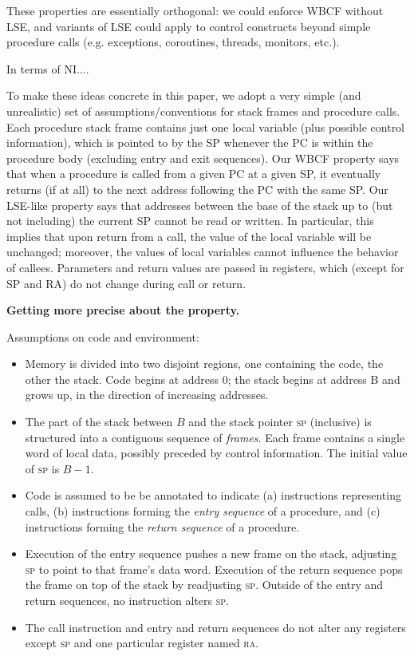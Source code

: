 \documentclass[conference]{IEEEtran}
\begin{document}
These properties are essentially orthogonal: we could enforce WBCF without LSE, and variants of
LSE could apply to control constructs beyond simple procedure calls (e.g. exceptions, coroutines, threads, monitors, etc.).


In terms of NI....

To make these ideas concrete in this paper, we adopt a very simple (and unrealistic) set of assumptions/conventions for stack frames and procedure calls.
Each procedure stack frame contains just one local variable (plus possible control information), which is pointed to by
the SP whenever the PC is within the procedure body (excluding entry and exit sequences). Our WBCF property says that
when a procedure is called from a given PC at a given SP, it eventually returns (if at all) to the next
address following the PC with the same SP. Our LSE-like property says that addresses between the base of the stack
up to (but not including) the current SP cannot be read or written.
In particular, this implies that upon return from a call,
the value of the local variable will be unchanged; moreover, the values of local variables cannot influence the
behavior of callees. Parameters and return values are passed in registers, which (except for SP and RA) do not change
during call or return.

{\bf Getting more precise about the property.}

Assumptions on code and environment:
\begin{itemize}
\item
  Memory is divided into two disjoint regions, one containing the code, the other the stack.
  Code begins at address 0; the stack begins at address B and grows up, in the direction of increasing addresses.
\item
  The part of the stack between $B$ and the stack pointer \textsc{sp} (inclusive) is structured into a contiguous sequence of
  \emph{frames}. Each frame contains a single word of local data, possibly preceded by control information. 
  The initial value of \textsc{sp} is $B-1$.
\item
  Code is assumed to be be annotated to indicate (a) instructions representing calls, (b) instructions forming the \emph{entry sequence} of
  a procedure, and (c) instructions forming the \emph{return sequence} of a procedure.
\item
  Execution of the entry sequence pushes a new frame on the stack, adjusting \textsc{sp} to point to that
  frame's data word.  Execution of the return sequence pops the frame on top of the stack by readjusting \textsc{sp}.
  Outside of the entry and return sequences, no instruction alters \textsc{sp}.
\item
  The call instruction and entry and return sequences do not alter any registers except \textsc{sp} and one
  particular register named \textsc{ra}.
\end{itemize}
\end{document}
